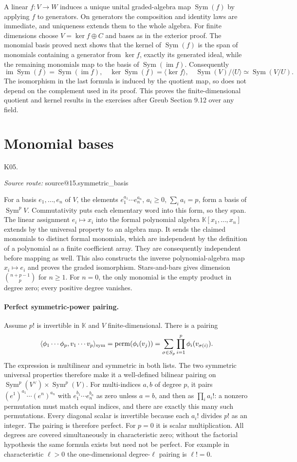\documentclass[11pt,a4paper]{book}
\makeatletter
\theoremstyle{definition}\newtheorem{definition}[theorem]{Definition}
\theoremstyle{remark}\newtheorem{remark}[theorem]{Remark}
\newcommand{\K}{\mathbb K}\newcommand{\R}{\mathbb R}\newcommand{\C}{\mathbb C}
\DeclareMathOperator{\im}{im}\DeclareMathOperator{\rank}{rank}
\DeclareMathOperator{\Sym}{Sym}\DeclareMathOperator{\Ann}{Ann}
\newcommand{\Kentry}[2]{\section{#2}\label{k:#1}\noindent\textsf{\small K05.\detokenize{#1}}\par
  \begingroup\small\color{black!65}\textit{Source route: }\csname source@#1\endcsname\par\endgroup}
\makeatother
\begin{document}
A linear $f:V\to W$ induces a unique unital graded-algebra map $\Sym(f)$ by applying $f$ to generators. On generators the composition and identity laws are immediate, and uniqueness extends them to the whole algebra. For finite dimensions choose $V=\ker f\oplus C$ and bases as in the exterior proof. The monomial basis proved next shows that the kernel of $\Sym(f)$ is the span of monomials containing a generator from $\ker f$, exactly its generated ideal, while the remaining monomials map to the basis of $\Sym(\im f)$. Consequently
\[
 \im\Sym(f)=\Sym(\im f),\quad
 \ker\Sym(f)=\langle\ker f\rangle,\quad
 \Sym(V)/\langle U\rangle\simeq\Sym(V/U).
\]
The isomorphism in the last formula is induced by the quotient map, so does not depend on the complement used in its proof. This proves the finite-dimensional quotient and kernel results in the exercises after Greub Section 9.12 over any field.

\Kentry{15.symmetric_basis}{Monomial bases}
For a basis $e_1,\ldots,e_n$ of $V$, the elements $e_1^{a_1}\cdots e_n^{a_n}$, $a_i\ge0$, $\sum_i a_i=p$, form a basis of $\Sym^p V$. Commutativity puts each elementary word into this form, so they span. The linear assignment $e_i\mapsto x_i$ into the formal polynomial algebra $\K[x_1,\ldots,x_n]$ extends by the universal property to an algebra map. It sends the claimed monomials to distinct formal monomials, which are independent by the definition of a polynomial as a finite coefficient array. They are consequently independent before mapping as well. This also constructs the inverse polynomial-algebra map $x_i\mapsto e_i$ and proves the graded isomorphism. Stars-and-bars gives dimension $\binom{n+p-1}{p}$ for $n\ge1$. For $n=0$, the only monomial is the empty product in degree zero; every positive degree vanishes.


\paragraph{Perfect symmetric-power pairing.}
Assume $p!$ is invertible in $\K$ and $V$ finite-dimensional. There is a pairing
\[
 \langle\phi_1\cdots\phi_p,v_1\cdots v_p\rangle_{\rm sym}
  =\operatorname{perm}(\phi_i(v_j))
  =\sum_{\sigma\in S_p}\prod_{i=1}^p\phi_i(v_{\sigma(i)}).
\]
The expression is multilinear and symmetric in both lists. The two symmetric universal properties therefore make it a well-defined bilinear pairing on $\Sym^p(V^\vee)\times\Sym^p(V)$. For multi-indices $a,b$ of degree $p$, it pairs $(e^1)^{a_1}\cdots(e^n)^{a_n}$ with $e_1^{b_1}\cdots e_n^{b_n}$ as zero unless $a=b$, and then as $\prod_i a_i!$: a nonzero permutation must match equal indices, and there are exactly this many such permutations. Every diagonal scalar is invertible because each $a_i!$ divides $p!$ as an integer. The pairing is therefore perfect. For $p=0$ it is scalar multiplication. All degrees are covered simultaneously in characteristic zero; without the factorial hypothesis the same formula exists but need not be perfect. For example in characteristic $\ell>0$ the one-dimensional degree-$\ell$ pairing is $\ell!=0$.
\end{document}
